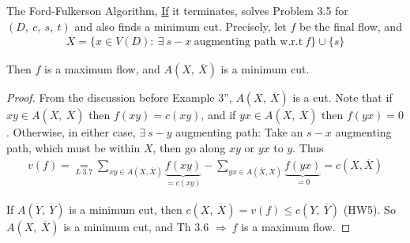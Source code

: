 \begin{theorem}
    The Ford-Fulkerson Algorithm, \uline{If} it terminates, solves Problem 3.5 for $(D,\ c,\ s,\ t)$ and also finds a minimum cut. Precisely, let $f$ be the final flow, and 
    \begin{align*}
        X = \{x\in V(D):\ \exists\ s-x\ \text{augmenting path w.r.t}\ f\} \cup \{s\}
    \end{align*}

    Then $f$ is a maximum flow, and $A(X,\ \overline{X})$ is a minimum cut.
\end{theorem}
\begin{proof}
    From the discussion before Example 3'', $A(X,\ \overline{X})$ is a cut. Note that if $xy\in A(X,\ \overline{X})$ then $f(xy) = c(xy)$, and if $yx\in A(X,\ \overline{X})$ then $f(yx) = 0$. Otherwise, in either case, $\exists\ s-y$ augmenting path: Take an $s-x$ augmenting path, which must be within $X$, then go along $xy$ or $yx$ to $y$. Thus
    \begin{align*}
        v(f) = \underset{L\ 3.7}{=} \sum\limits_{xy\in A(X,\overline{X})} \underbrace{f(xy)}\limits_{=c(xy)} - \sum\limits_{yx\in A(\overline{X},X)} \underbrace{f(yx)}\limits_{=0} = c(X,\overline{X})
    \end{align*}

    If $A(Y,\ \overline{Y})$ is a minimum cut, then $c(X,\ \overline{X}) = v(f) \leqslant c(Y,\ \overline{Y})$ (HW5). So $A(X,\ \overline{X})$ is a minimum cut, and Th 3.6 $\Rightarrow\ f$ is a maximum flow. 
\end{proof}

